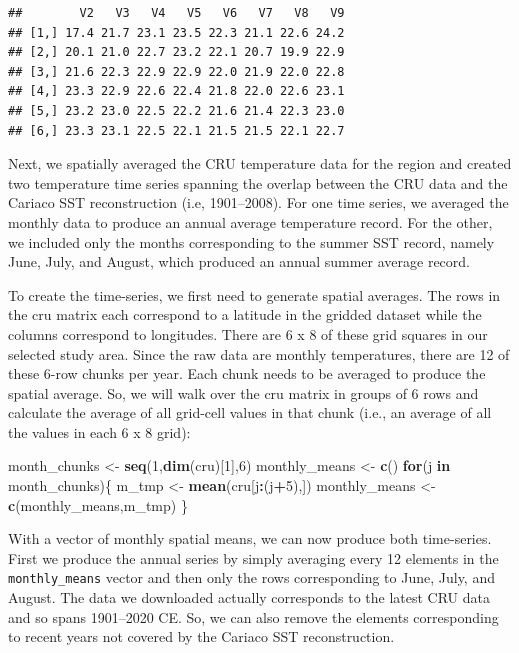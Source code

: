 \documentclass[]{article}
\newenvironment{Shaded}{\begin{snugshade}}{\end{snugshade}}
\newcommand{\KeywordTok}[1]{\textcolor[rgb]{0.13,0.29,0.53}{\textbf{#1}}}
\newcommand{\DecValTok}[1]{\textcolor[rgb]{0.00,0.00,0.81}{#1}}
\newcommand{\StringTok}[1]{\textcolor[rgb]{0.31,0.60,0.02}{#1}}
\newcommand{\ControlFlowTok}[1]{\textcolor[rgb]{0.13,0.29,0.53}{\textbf{#1}}}
\newcommand{\OperatorTok}[1]{\textcolor[rgb]{0.81,0.36,0.00}{\textbf{#1}}}
\newcommand{\NormalTok}[1]{#1}
\begin{document}
\begin{verbatim}
##        V2   V3   V4   V5   V6   V7   V8   V9
## [1,] 17.4 21.7 23.1 23.5 22.3 21.1 22.6 24.2
## [2,] 20.1 21.0 22.7 23.2 22.1 20.7 19.9 22.9
## [3,] 21.6 22.3 22.9 22.9 22.0 21.9 22.0 22.8
## [4,] 23.3 22.9 22.6 22.4 21.8 22.0 22.6 23.1
## [5,] 23.2 23.0 22.5 22.2 21.6 21.4 22.3 23.0
## [6,] 23.3 23.1 22.5 22.1 21.5 21.5 22.1 22.7
\end{verbatim}

Next, we spatially averaged the CRU temperature data for the region and
created two temperature time series spanning the overlap between the CRU
data and the Cariaco SST reconstruction (i.e, 1901--2008). For one time
series, we averaged the monthly data to produce an annual average
temperature record. For the other, we included only the months
corresponding to the summer SST record, namely June, July, and August,
which produced an annual summer average record.

To create the time-series, we first need to generate spatial averages.
The rows in the cru matrix each correspond to a latitude in the gridded
dataset while the columns correspond to longitudes. There are 6 x 8 of
these grid squares in our selected study area. Since the raw data are
monthly temperatures, there are 12 of these 6-row chunks per year. Each
chunk needs to be averaged to produce the spatial average. So, we will
walk over the cru matrix in groups of 6 rows and calculate the average
of all grid-cell values in that chunk (i.e., an average of all the
values in each 6 x 8 grid):

\begin{Shaded}
\begin{Highlighting}[]
\NormalTok{month_chunks <-}\StringTok{ }\KeywordTok{seq}\NormalTok{(}\DecValTok{1}\NormalTok{,}\KeywordTok{dim}\NormalTok{(cru)[}\DecValTok{1}\NormalTok{],}\DecValTok{6}\NormalTok{)}
\NormalTok{monthly_means <-}\StringTok{ }\KeywordTok{c}\NormalTok{()}
\ControlFlowTok{for}\NormalTok{(j }\ControlFlowTok{in}\NormalTok{ month_chunks)\{}
\NormalTok{    m_tmp <-}\StringTok{ }\KeywordTok{mean}\NormalTok{(cru[j}\OperatorTok{:}\NormalTok{(j}\OperatorTok{+}\DecValTok{5}\NormalTok{),])}
\NormalTok{    monthly_means <-}\StringTok{ }\KeywordTok{c}\NormalTok{(monthly_means,m_tmp)}
\NormalTok{\}}
\end{Highlighting}
\end{Shaded}

With a vector of monthly spatial means, we can now produce both
time-series. First we produce the annual series by simply averaging
every 12 elements in the \texttt{monthly\_means} vector and then only
the rows corresponding to June, July, and August. The data we downloaded
actually corresponds to the latest CRU data and so spans 1901--2020 CE.
So, we can also remove the elements corresponding to recent years not
covered by the Cariaco SST reconstruction.
\end{document}
